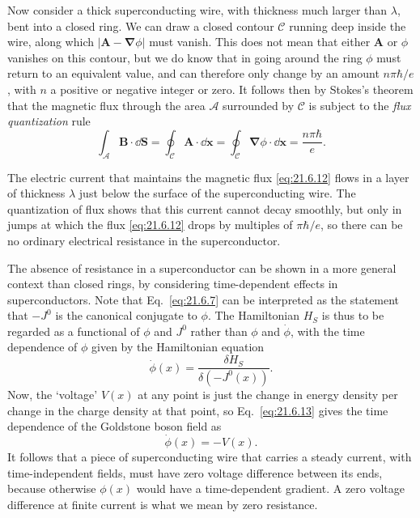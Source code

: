 Now consider a thick superconducting wire, with thickness much larger than $\lambda$, bent into a closed ring. We can draw a closed contour $\mathcal C$ running deep inside the wire, along which $|\mathbf A-\boldsymbol\nabla\phi|$ must vanish. This does not mean that either $\mathbf A$ or $\phi$ vanishes on this contour, but we do know that in going around the ring $\phi$ must return to an equivalent value, and can therefore only change by an amount $n\pi\hbar/e$, with $n$ a positive or negative integer or zero. It follows then by Stokes's theorem that the magnetic flux through the area $\mathcal A$ surrounded by $\mathcal C$ is subject to the \emph{flux quantization} rule
\begin{equation}
\int_{\mathcal A}\mathbf B\cdot \dd\mathbf S
=\oint_{\mathcal C}\mathbf A\cdot \dd\mathbf x
=\oint_{\mathcal C}\boldsymbol\nabla\phi\cdot \dd\mathbf x
=\frac{n\pi\hbar}{e}.
\tag{21.6.12}\label{eq:21.6.12}
\end{equation}

The electric current that maintains the magnetic flux \eqref{eq:21.6.12} flows in a layer of thickness $\lambda$ just below the surface of the superconducting wire. The quantization of flux shows that this current cannot decay smoothly, but only in jumps at which the flux \eqref{eq:21.6.12} drops by multiples of $\pi\hbar/e$, so there can be no ordinary electrical resistance in the superconductor.

The absence of resistance in a superconductor can be shown in a more general context than closed rings, by considering time-dependent effects in superconductors. Note that Eq.~\eqref{eq:21.6.7} can be interpreted as the statement that $-J^0$ is the canonical conjugate to $\phi$. The Hamiltonian $H_S$ is thus to be regarded as a functional of $\phi$ and $J^0$ rather than $\phi$ and $\dot\phi$, with the time dependence of $\phi$ given by the Hamiltonian equation
\begin{equation}
\dot\phi(x)=\frac{\delta H_S}{\delta(-J^0(x))}.
\tag{21.6.13}\label{eq:21.6.13}
\end{equation}
Now, the `voltage' $V(x)$ at any point is just the change in energy density per change in the charge density at that point, so Eq.~\eqref{eq:21.6.13} gives the time dependence of the Goldstone boson field as
\begin{equation}
\dot\phi(x)=-V(x).
\tag{21.6.14}\label{eq:21.6.14}
\end{equation}
It follows that a piece of superconducting wire that carries a steady current, with time-independent fields, must have zero voltage difference between its ends, because otherwise $\phi(x)$ would have a time-dependent gradient. A zero voltage difference at finite current is what we mean by zero resistance.

